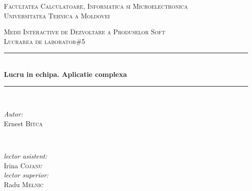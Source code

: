 \begin{titlepage}

\begin{center} %

\textsc{\large Facultatea Calculatoare, Informatica si Microelectronica}\\[0.5cm]
\textsc{\large Universitatea Tehnica a Moldovei}\\[1.2cm] %
\vspace{25 mm}

\textsc{\Large Medii Interactive de Dezvoltare a Produselor Soft}\\[0.5cm] %
\textsc{\large Lucrarea de laborator\#5}\\[0.5cm] %

\newcommand{\HRule}{\rule{\linewidth}{0.5mm}} %

\vspace{10 mm}
\HRule \\[0.4cm]
{ \LARGE \bfseries Lucru in echipa. Aplicatie complexa}\\[0.4cm] %
\HRule \\[1.5cm]

\vspace{30mm}

\begin{minipage}{0.4\textwidth}
\begin{flushleft} \large
\emph{Autor:}\\
		Ernest \textsc{Bitca}
		\end{flushleft}
		\end{minipage}
		~
		\begin{minipage}{0.4\textwidth}
		\begin{flushright} \large
		\emph{lector asistent:} \\
			Irina \textsc{Cojanu} \\ %
			\emph{lector superior:} \\
				Radu \textsc{Melnic} %
				\end{flushright}
				\end{minipage}\\[4cm]


\end{center}
\end{titlepage}
